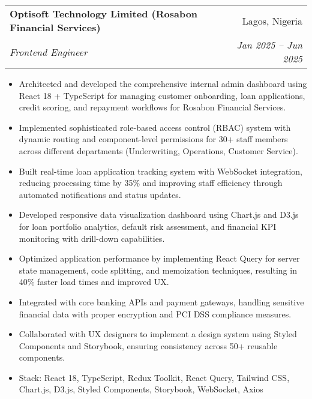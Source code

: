 \documentclass[letterpaper,11pt]{article}
\makeatletter
\newcommand{\resumeItem}[1]{
  \item\small{
    {#1 \vspace{-2pt}}
  }
}
\newcommand{\resumeSubheading}[4]{
  \vspace{-1pt}\item
    \begin{tabular*}{0.97\textwidth}{l@{\extracolsep{\fill}}r}
      \textbf{#1} & #2 \\
      \textit{\small#3} & \textit{\small #4} \\
    \end{tabular*}\vspace{-5pt}
}
\newcommand{\resumeItemListStart}{\begin{itemize}}
\newcommand{\resumeItemListEnd}{\end{itemize}\vspace{-5pt}}
\makeatother
\begin{document}
    \resumeSubheading
    {Optisoft Technology Limited (Rosabon Financial Services)}{Lagos, Nigeria}
    {Frontend Engineer}{Jan 2025 – Jun 2025}
    \resumeItemListStart
      \resumeItem{Architected and developed the comprehensive internal admin dashboard using React 18 + TypeScript for managing customer onboarding, loan applications, credit scoring, and repayment workflows for Rosabon Financial Services.}
      \resumeItem{Implemented sophisticated role-based access control (RBAC) system with dynamic routing and component-level permissions for 30+ staff members across different departments (Underwriting, Operations, Customer Service).}
      \resumeItem{Built real-time loan application tracking system with WebSocket integration, reducing processing time by 35\% and improving staff efficiency through automated notifications and status updates.}
      \resumeItem{Developed responsive data visualization dashboard using Chart.js and D3.js for loan portfolio analytics, default risk assessment, and financial KPI monitoring with drill-down capabilities.}
      \resumeItem{Optimized application performance by implementing React Query for server state management, code splitting, and memoization techniques, resulting in 40\% faster load times and improved UX.}
      \resumeItem{Integrated with core banking APIs and payment gateways, handling sensitive financial data with proper encryption and PCI DSS compliance measures.}
      \resumeItem{Collaborated with UX designers to implement a design system using Styled Components and Storybook, ensuring consistency across 50+ reusable components.}
      \resumeItem{Stack: React 18, TypeScript, Redux Toolkit, React Query, Tailwind CSS, Chart.js, D3.js, Styled Components, Storybook, WebSocket, Axios}
    \resumeItemListEnd
\end{document}
